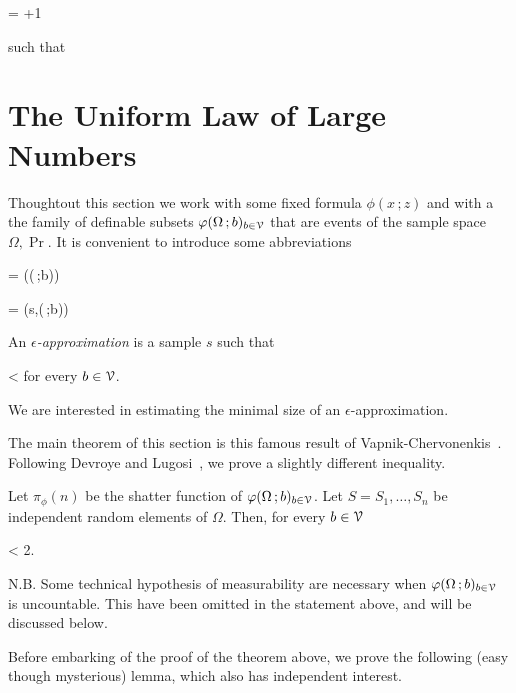 \documentclass[scombinatorics.tex]{subfiles}
\begin{document}
{\begin{corollary}
      {=}
      {\left\lfloor{}+1\right\rfloor} 
      
  such that

  \QED
\end{corollary}


\section{The Uniform Law of Large Numbers}\label{uniform}

Thoughtout this section we work with some fixed formula $\phi(x\,;z)$ and with a the family of definable subsets $\varphi(\Omega\,;b)_{b\in\EuScript V}$ that are events of the sample space $\Omega,\Pr$.
It is convenient to introduce some abbreviations

{=}
{\Pr\Big(\phi(\Omega\,;b)\Big)}

{=}
{\Fr\Big(s,\phi(\Omega\,;b)\Big)}

An \emph{$\epsilon$-approximation\/} is a sample $s$ such that

{<}
{\epsilon}
\hfill for every $b\in\EuScript V$.

We are interested in estimating the minimal size of an $\epsilon$-approximation.

The main theorem of this section is this famous result of Vapnik-Chervonenkis~\cite{VC}.
Following Devroye and Lugosi~\cite{DL}, we prove a slightly different inequality.
 
\begin{void_thm}\label{VC_inequality}
  Let $\pi_\phi(n)$ be the shatter function of $\varphi(\Omega\,;b)_{b\in\EuScript V}$.
  Let $S=S_1,\dots,S_n$ be independent random elements of $\Omega$.
  Then, for every $b\in\EuScript V$

  {<}
  {2}.\QED
\end{void_thm}

N.B. Some technical hypothesis of measurability are necessary when $\varphi(\Omega\,;b)_{b\in\EuScript V}$ is uncountable. This have been omitted in the statement above, and will be discussed below.


Before embarking of the proof of the theorem above, we prove the following (easy though mysterious) lemma, which also has independent interest.

}
\end{document}
